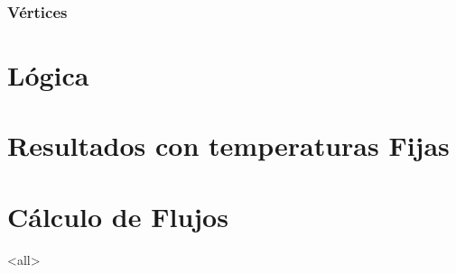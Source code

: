 \subsubsection{Vértices} 

\section{Lógica}

\section{Resultados con temperaturas Fijas}

\section{Cálculo de Flujos}

\mode<all>
%
%
%
%
%

